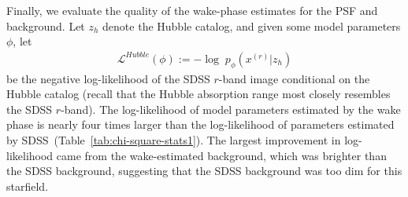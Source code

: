 


Finally, we evaluate the quality of the wake-phase estimates for the PSF and background. Let $z_h$ denote the Hubble catalog, and given some model parameters $\phi$, let
\begin{align}
    \mathcal{L}^{Hubble}(\phi) := 
    - \log \; p_\phi(x^{(r)} | z_h)
    \label{eq:hubble_neg_loglik}
\end{align}
be the negative log-likelihood of the SDSS $r$-band image conditional on the Hubble catalog (recall that the Hubble absorption range most closely resembles the SDSS $r$-band).
The log-likelihood of model parameters estimated by the wake phase is nearly four times larger than the log-likelihood of parameters estimated by SDSS~(Table~\ref{tab:chi-square-stats1}). 
The largest improvement in log-likelihood came from the wake-estimated background, which was brighter than the SDSS background, suggesting that the SDSS background was too dim for this starfield. 



